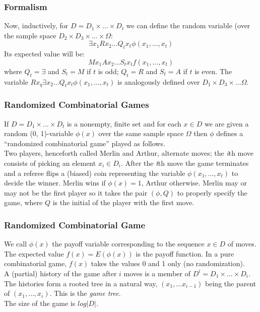 \documentclass{beamer}
\begin{document}
\begin{frame}
\frametitle{Formalism}
Now, inductively, for $D = D_1 \times \ldots \times D_t$ we can define the random variable (over the sample space $D_2 \times D_3 \times \ldots \times \Omega$: $$\exists x_1 R x_2 \ldots Q_t x_t \phi(x_1, \ldots, x_t)$$
Its expected value will be: $$M x_1 A x_2 \ldots S_t x_t f(x_1, \ldots, x_t)$$
where $Q_t = \exists$ and $S_t = M$ if $t$ is odd; $Q_t = R$ and $S_t = A$ if $t$ is even. The variable $R x_q \exists x_2 \dots Q_t x_t \phi (x_1,\ldots,x_t)$ is analogously defined over $D_1 \times D_3 \times \dots \Omega$.
\end{frame}

\begin{frame}
\frametitle{Randomized Combinatorial Games}
If $D = D_1 \times \ldots \times D_t$ is a nonempty, finite set and for each $x \in D$ we are given a random (0, 1)-variable $\phi(x)$ over the same sample space $\Omega$  then $\phi$ defines a ``randomized combinatorial game'' played as follows.\\
Two players, henceforth called Merlin and Arthur, alternate moves; the \textit{i}th move consists of picking an element $x_i \in D_i$. After the \textit{t}th move the game terminates and a referee flips a (biased) coin representing the variable $\phi(x_1,\ldots,x_t)$ to decide the winner. Merlin wins if $\phi(x) = 1$, Arthur otherwise. Merlin may or may not be the first player so it takes the pair $(\phi, Q)$ to properly specify the game, where $Q$ is the initial of the player with the first move.
\end{frame}

\begin{frame}
\frametitle{Randomized Combinatorial Game}
We call $\phi(x)$ the payoff variable corresponding to the sequence $x \in D$ of moves. The expected value $f(x) = E(\phi(x))$ is the payoff function. In a pure combinatorial game, $f(x)$ takes the values 0 and 1 only (no randomization).\\
A (partial) history of the game after $i$ moves is a member of $D^i = D_1 \times \ldots \times D_i$. The histories form a rooted tree in a natural way, $(x_1, \ldots x_{i-1})$ being the parent of $(x_1,\ldots,x_i)$. This is the \textit{game tree}.\\
The size of the game is $log|D|$.
\end{frame}
\end{document}
